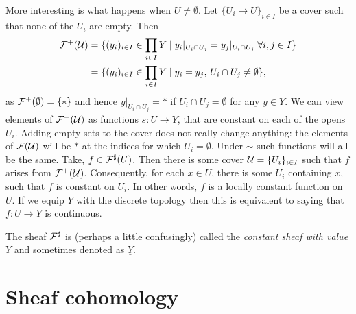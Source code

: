 \documentclass{article}
\begin{document}
\begin{example}
    More interesting is what happens when $U \neq \emptyset$.
    Let $\{U_i \to U\}_{i\in I}$ be a cover such that
    none of the $U_i$ are empty. Then
    \begin{align*}
        \mathcal{F}^+(\mathcal{U}) & =
        \{(y_i)_{i\in I}\in \prod_{i\in I} Y \mid
        y_i|_{U_i \cap U_j} = y_j|_{U_i \cap U_j}\; \forall i,j \in I\} \\
                     & = \{(y_i)_{i\in I}\in \prod_{i\in I}Y\mid
        y_i = y_j,\, U_i \cap U_j \neq \emptyset\},
    \end{align*}
    as $\mathcal{F}^+(\emptyset) = \{*\}$ and hence $y|_{U_i \cap U_j} = *$
    if $U_i \cap U_j = \emptyset$ for any $y \in Y$.
    We can view elements of $\mathcal{F}^+(\mathcal{U})$ as functions $s\colon U \to Y$,
    that are constant on each of the opens $U_i$.
    Adding empty sets
    to the cover does not really change anything: the elements of
    $\mathcal{F}(\mathcal{U})$ will be $*$ at the indices for which $U_i = \emptyset$.
    Under $\sim$ such functions will all be the same.
    Take, $f \in \mathcal{F}^\sharp(U)$. Then there is some cover
    $\mathcal{U} = \{U_i\}_{i\in I}$ such that $f$
    arises from $\mathcal{F}^+(\mathcal{U})$. Consequently, for each $x\in U$,
    there is some $U_i$ containing $x$, such that $f$
    is constant on $U_i$. In other words, $f$ is a locally
    constant function on $U$. If we equip $Y$ with the discrete
    topology then this is equivalent to saying that $f\colon U \to Y$
    is continuous.

    The sheaf $\mathcal{F}^\sharp$ is (perhaps a little confusingly) called the
    \emph{constant sheaf with value $Y$} and sometimes
    denoted as $\underline{Y}$.
\end{example}
\section{Sheaf cohomology}
\end{document}
